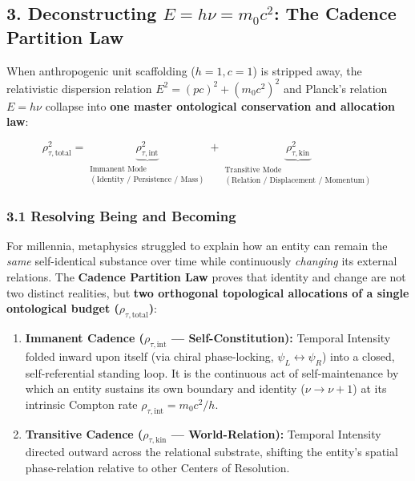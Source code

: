 \documentclass[
]{article}
\providecommand{\tightlist}{%
  \setlength{\itemsep}{0pt}\setlength{\parskip}{0pt}}
\begin{document}
\subsection{\texorpdfstring{3. Deconstructing \(E = h\nu = m_0 c^2\):
The Cadence Partition
Law}{3. Deconstructing E = h\textbackslash nu = m\_0 c\^{}2: The Cadence Partition Law}}\label{deconstructing-e-hnu-m_0-c2-the-cadence-partition-law}

When anthropogenic unit scaffolding (\(h = 1, c = 1\)) is stripped away,
the relativistic dispersion relation \(E^2 = (pc)^2 + (m_0 c^2)^2\) and
Planck's relation \(E = h\nu\) collapse into \textbf{one master
ontological conservation and allocation law}:

\[\rho_{\tau,\text{total}}^2 = \underbrace{\rho_{\tau,\text{int}}^2}_{\substack{\text{Immanent Mode} \\ (\text{Identity / Persistence / Mass})}} + \underbrace{\rho_{\tau,\text{kin}}^2}_{\substack{\text{Transitive Mode} \\ (\text{Relation / Displacement / Momentum})}}\]

\subsubsection{3.1 Resolving Being and
Becoming}\label{resolving-being-and-becoming}

For millennia, metaphysics struggled to explain how an entity can remain
the \emph{same} self-identical substance over time while continuously
\emph{changing} its external relations. The \textbf{Cadence Partition
Law} proves that identity and change are not two distinct realities, but
\textbf{two orthogonal topological allocations of a single ontological
budget (\(\rho_{\tau,\text{total}}\))}:

\begin{enumerate}
\def\labelenumi{\arabic{enumi}.}
\tightlist
\item
  \textbf{Immanent Cadence (\(\rho_{\tau,\text{int}}\) ---
  Self-Constitution):} Temporal Intensity folded inward upon itself (via
  chiral phase-locking, \(\psi_L \leftrightarrow \psi_R\)) into a
  closed, self-referential standing loop. It is the continuous act of
  self-maintenance by which an entity sustains its own boundary and
  identity (\(\nu \to \nu + 1\)) at its intrinsic Compton rate
  \(\rho_{\tau,\text{int}} = m_0 c^2 / h\).
\item
  \textbf{Transitive Cadence (\(\rho_{\tau,\text{kin}}\) ---
  World-Relation):} Temporal Intensity directed outward across the
  relational substrate, shifting the entity's spatial phase-relation
  relative to other Centers of Resolution.
\end{enumerate}
\end{document}
